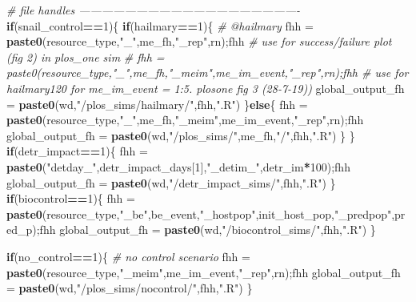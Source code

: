 \documentclass[10,portrait]{article}
\newenvironment{Shaded}{\begin{snugshade}}{\end{snugshade}}
\newcommand{\KeywordTok}[1]{\textcolor[rgb]{0.13,0.29,0.53}{\textbf{#1}}}
\newcommand{\DecValTok}[1]{\textcolor[rgb]{0.00,0.00,0.81}{#1}}
\newcommand{\StringTok}[1]{\textcolor[rgb]{0.31,0.60,0.02}{#1}}
\newcommand{\CommentTok}[1]{\textcolor[rgb]{0.56,0.35,0.01}{\textit{#1}}}
\newcommand{\ControlFlowTok}[1]{\textcolor[rgb]{0.13,0.29,0.53}{\textbf{#1}}}
\newcommand{\OperatorTok}[1]{\textcolor[rgb]{0.81,0.36,0.00}{\textbf{#1}}}
\newcommand{\NormalTok}[1]{#1}
\begin{document}
\begin{Shaded}
\begin{Highlighting}[]
{{{        \CommentTok{# file handles   ----------------------------------------------------------}
        \ControlFlowTok{if}\NormalTok{(snail_control}\OperatorTok{==}\DecValTok{1}\NormalTok{)\{    }
          \ControlFlowTok{if}\NormalTok{(hailmary}\OperatorTok{==}\DecValTok{1}\NormalTok{)\{ }\CommentTok{# @hailmary}
\NormalTok{            fhh =}\StringTok{ }\KeywordTok{paste0}\NormalTok{(resource_type,}\StringTok{"_"}\NormalTok{,me_fh,}\StringTok{"_rep"}\NormalTok{,rn);fhh }\CommentTok{# use for success/failure plot (fig 2) in plos_one sim}
            \CommentTok{# fhh = paste0(resource_type,"_",me_fh,"_meim",me_im_event,"_rep",rn);fhh # use for hailmary120 for me_im_event = 1:5. plosone fig 3 (28-7-19))}
\NormalTok{            global_output_fh =}\StringTok{ }\KeywordTok{paste0}\NormalTok{(wd,}\StringTok{"/plos_sims/hailmary/"}\NormalTok{,fhh,}\StringTok{".R"}\NormalTok{)}
\NormalTok{          \}}\ControlFlowTok{else}\NormalTok{\{}
\NormalTok{            fhh =}\StringTok{ }\KeywordTok{paste0}\NormalTok{(resource_type,}\StringTok{"_"}\NormalTok{,me_fh,}\StringTok{"_meim"}\NormalTok{,me_im_event,}\StringTok{"_rep"}\NormalTok{,rn);fhh}
\NormalTok{            global_output_fh =}\StringTok{ }\KeywordTok{paste0}\NormalTok{(wd,}\StringTok{"/plos_sims/"}\NormalTok{,me_fh,}\StringTok{"/"}\NormalTok{,fhh,}\StringTok{".R"}\NormalTok{)}
\NormalTok{          \}}
\NormalTok{        \}}
        \ControlFlowTok{if}\NormalTok{(detr_impact}\OperatorTok{==}\DecValTok{1}\NormalTok{)\{}
\NormalTok{          fhh =}\StringTok{ }\KeywordTok{paste0}\NormalTok{(}\StringTok{"detday_"}\NormalTok{,detr_impact_days[}\DecValTok{1}\NormalTok{],}\StringTok{"_detim_"}\NormalTok{,detr_im}\OperatorTok{*}\DecValTok{100}\NormalTok{);fhh}
\NormalTok{          global_output_fh =}\StringTok{ }\KeywordTok{paste0}\NormalTok{(wd,}\StringTok{"/detr_impact_sims/"}\NormalTok{,fhh,}\StringTok{".R"}\NormalTok{)}
\NormalTok{        \}}
        \ControlFlowTok{if}\NormalTok{(biocontrol}\OperatorTok{==}\DecValTok{1}\NormalTok{)\{}
\NormalTok{          fhh =}\StringTok{ }\KeywordTok{paste0}\NormalTok{(resource_type,}\StringTok{"_be"}\NormalTok{,be_event,}\StringTok{"_hostpop"}\NormalTok{,init_host_pop,}\StringTok{"_predpop"}\NormalTok{,pred_p);fhh}
\NormalTok{          global_output_fh =}\StringTok{ }\KeywordTok{paste0}\NormalTok{(wd,}\StringTok{"/biocontrol_sims/"}\NormalTok{,fhh,}\StringTok{".R"}\NormalTok{)}
\NormalTok{        \}  }
        
        \ControlFlowTok{if}\NormalTok{(no_control}\OperatorTok{==}\DecValTok{1}\NormalTok{)\{}
          \CommentTok{# no control scenario}
\NormalTok{          fhh =}\StringTok{ }\KeywordTok{paste0}\NormalTok{(resource_type,}\StringTok{"_meim"}\NormalTok{,me_im_event,}\StringTok{"_rep"}\NormalTok{,rn);fhh}
\NormalTok{          global_output_fh =}\StringTok{ }\KeywordTok{paste0}\NormalTok{(wd,}\StringTok{"/plos_sims/nocontrol/"}\NormalTok{,fhh,}\StringTok{".R"}\NormalTok{)}
\NormalTok{        \}}
        
}}}
\end{Highlighting}
\end{Shaded}
\end{document}
